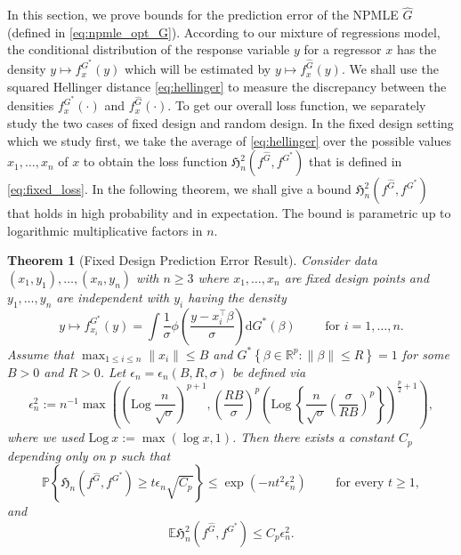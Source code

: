 \documentclass[11pt]{article}
\numberwithin{equation}{section}
\newtheorem{theorem}{Theorem}[section]
\newcommand{\T}{ \top }
\def\qt#1{\qquad\text{#1}}
\newcommand{\Log}{\mathrm{Log}~}
\newcommand{\E}{\mathbb{E}}
\newcommand{\PP}{\mathbb{P}}
\begin{document}
\label{section:hellinger_distance_bound}

In this section, we prove bounds for the prediction error of the NPMLE $\hat{G}$ (defined in \eqref{eq:npmle_opt_G}). According to our mixture of regressions model, the conditional distribution of the response variable $y$ for a regressor $x$ has the density $y \mapsto f_x^{G^*}(y)$  which  will be estimated by $y \mapsto f_x^{\hat{G}}(y)$. We shall use the squared Hellinger distance \eqref{eq:hellinger}  to measure the discrepancy  between the densities $f_x^{G^*}(\cdot)$ and $f_x^{\hat{G}}(\cdot)$. To get our overall loss function, we separately study the two cases of fixed design and random design. In the fixed design setting which we study first, we take the average of \eqref{eq:hellinger} over the possible values $x_1, \dots, x_n$ of $x$ to obtain the loss function $\mathfrak{H}_n^2(f^{\hat{G}}, f^{G^*})$ that is defined in \eqref{eq:fixed_loss}. In the following theorem, we shall give a bound $\mathfrak{H}_n^2(f^{\hat{G}}, f^{G^*})$ that holds in high probability and in expectation. The bound is parametric up to logarithmic multiplicative factors in $n$. 

\begin{theorem}[Fixed Design Prediction Error Result]
Consider data $(x_1, y_1), \dots, (x_n, y_n)$ with $n \geq 3$ where $x_1, \dots, x_n$ are fixed design points and $y_1, \dots, y_n$ are independent with $y_i$   having the density
\begin{equation}
y \mapsto f^{G^*}_{x_i}(y) =\int \frac{1}{\sigma}\phi\left(\frac{y- x_i^\T\beta}{\sigma} \right) \mathrm{d} G^*(\beta)\qt{ for $i = 1,\dots,n$}.
\end{equation}
Assume that $\max_{1 \le i \leq n} \|x_i\| \leq B$ and $G^* \left\{\beta \in \mathbb{R}^p : \|\beta\| \leq R \right\} = 1$ for some $B > 0$ and $R > 0$. Let $\epsilon_n = \epsilon_n(B, R, \sigma)$ be defined via 
\begin{equation}\label{eq:epsilon_defn}
  \epsilon^2_n := n^{-1} \max \left(\left(\Log  \frac{n}{\sqrt{\sigma}} \right)^{p+1} , \left(\frac{R B}{\sigma} \right)^p \left(\Log \left\{\frac{n}{\sqrt{\sigma}} \left(\frac{\sigma}{RB} \right)^p \right\} \right)^{\frac{p}{2} + 1}  \right),
\end{equation}
where we used $\Log x := \max(\log x, 1)$. Then there exists a constant $C_p$ depending only on $p$ such that   
\begin{equation}
\label{tailbound}
\PP \left\{\mathfrak{H}_n(f^{\hat{G}}, f^{G^*}) \geq t \epsilon_n \sqrt{C_p}  \right\} \leq  \exp(-nt^2 \epsilon_n^2) \qt{ for every $t \geq 1$},  
\end{equation}
and 
\begin{equation}
\E\mathfrak{H}_n^2(f^{\hat{G}}, f^{G^*}) \leq C_p \epsilon^2_n. 
\label{expectationbound}
\end{equation}
\label{mainthem}
\end{theorem}
\end{document}
